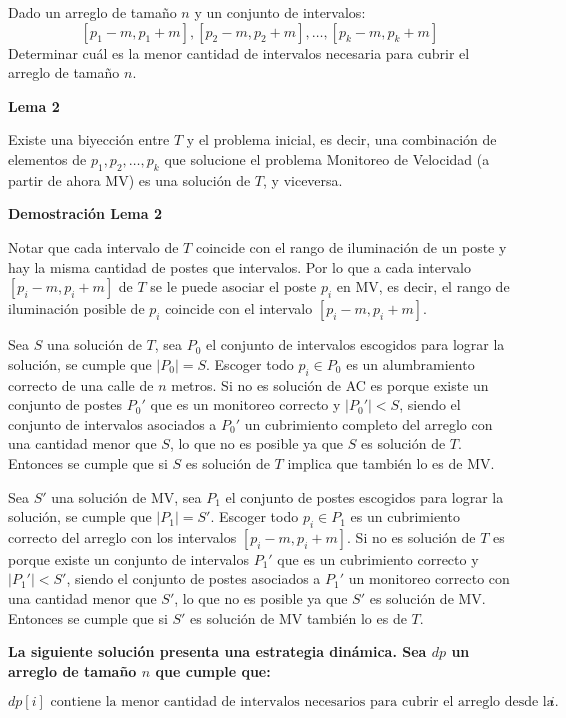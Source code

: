 \documentclass{article}
\begin{document}
Dado un arreglo de tamaño \( n \) y un conjunto de intervalos:
\[
[p_1 - m, p_1 + m], [p_2 - m, p_2 + m], \ldots, [p_k - m, p_k + m]
\]
Determinar cuál es la menor cantidad de intervalos necesaria para cubrir el arreglo de tamaño \( n \).

\textbf{Lema 2}

Existe una biyección entre \( T \) y el problema inicial, es decir, una combinación de elementos de \( p_1, p_2, \ldots, p_k \) que solucione el problema Monitoreo de Velocidad (a partir de ahora MV) es una solución de \( T \), y viceversa.

\textbf{Demostración Lema 2}

Notar que cada intervalo de \( T \) coincide con el rango de iluminación de un poste y hay la misma cantidad de postes que intervalos. Por lo que a cada intervalo \([p_i - m, p_i + m]\) de \( T \) se le puede asociar el poste \( p_i \) en MV, es decir, el rango de iluminación posible de \( p_i \) coincide con el intervalo \([p_i - m, p_i + m]\).

Sea \( S \) una solución de \( T \), sea \( P_0 \) el conjunto de intervalos escogidos para lograr la solución, se cumple que \(|P_0| = S\). Escoger todo \( p_i \in P_0 \) es un alumbramiento correcto de una calle de \( n \) metros. Si no es solución de AC es porque existe un conjunto de postes \( P_0' \) que es un monitoreo correcto y \(|P_0'| < S\), siendo el conjunto de intervalos asociados a \( P_0' \) un cubrimiento completo del arreglo con una cantidad menor que \( S \), lo que no es posible ya que \( S \) es solución de \( T \). Entonces se cumple que si \( S \) es solución de \( T \) implica que también lo es de MV.

Sea \( S' \) una solución de MV, sea \( P_1 \) el conjunto de postes escogidos para lograr la solución, se cumple que \(|P_1| = S'\). Escoger todo \( p_i \in P_1 \) es un cubrimiento correcto del arreglo con los intervalos \([p_i - m, p_i + m]\). Si no es solución de \( T \) es porque existe un conjunto de intervalos \( P_1' \) que es un cubrimiento correcto y \(|P_1'| < S'\), siendo el conjunto de postes asociados a \( P_1' \) un monitoreo correcto con una cantidad menor que \( S' \), lo que no es posible ya que \( S' \) es solución de MV. Entonces se cumple que si \( S' \) es solución de MV también lo es de \( T \).


\textbf{La siguiente solución presenta una estrategia dinámica. Sea \( dp \) un arreglo de tamaño \( n \) que cumple que:}

\[
dp[i] \text{ contiene la menor cantidad de intervalos necesarios para cubrir el arreglo desde la posición 1 hasta la } i.
\]
\end{document}
